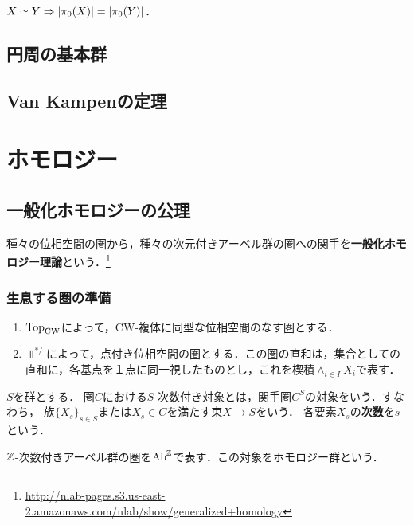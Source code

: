 \documentclass[uplatex,dvipdfmx]{jsreport}
\begin{document}
\begin{corollary}[最初のホモトピー不変量]
    $X\simeq Y\Rightarrow\lvert\pi_0(X)\rvert=\lvert\pi_0(Y)\rvert$．
\end{corollary}


\section{円周の基本群}

\section{Van Kampenの定理}

\chapter{ホモロジー}

\section{一般化ホモロジーの公理}

\begin{tcolorbox}[colframe=ForestGreen, colback=ForestGreen!10!white,breakable,colbacktitle=ForestGreen!40!white,coltitle=black,fonttitle=\bfseries\sffamily,
title=]
    種々の位相空間の圏から，種々の次元付きアーベル群の圏への関手を\textbf{一般化ホモロジー理論}という．\footnote{\url{http://nlab-pages.s3.us-east-2.amazonaws.com/nlab/show/generalized+homology}}
\end{tcolorbox}

\subsection{生息する圏の準備}

\begin{notation}\mbox{}
    \begin{enumerate}
        \item $\mathrm{Top}_{\mathrm{CW}}$によって，CW-複体に同型な位相空間のなす圏とする．
        \item $\Top^{*/}$によって，点付き位相空間の圏とする．この圏の直和は，集合としての直和に，各基点を１点に同一視したものとし，これを楔積$\wedge_{i\in I}X_i$で表す．
    \end{enumerate}
\end{notation}

\begin{definition}
    $S$を群とする．
    圏$C$における$S$-次数付き対象とは，関手圏$C^S$の対象をいう．すなわち，
    族$\{X_s\}_{s\in S}$または$X_s\in C$を満たす束$X\to S$をいう．
    各要素$X_s$の\textbf{次数}を$s$という．
\end{definition}
\begin{example}
    $\mathbb{Z}$-次数付きアーベル群の圏を$\mathrm{Ab}^{\mathbb{Z}}$で表す．この対象をホモロジー群という．
\end{example}
\end{document}
